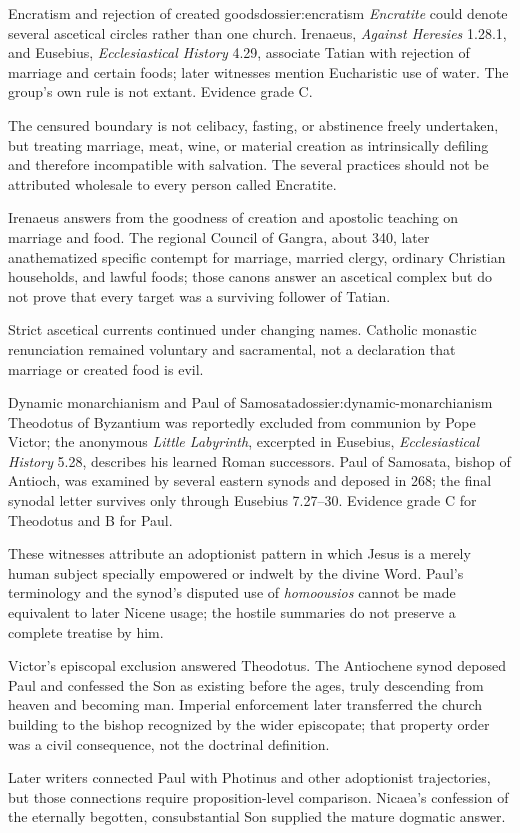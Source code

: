 \begin{heresydossier}{Encratism and rejection of created goods}{dossier:encratism}
\objectfield \emph{Encratite} could denote several ascetical circles rather than one church. Irenaeus, \emph{Against Heresies} 1.28.1, and Eusebius, \emph{Ecclesiastical History} 4.29, associate Tatian with rejection of marriage and certain foods; later witnesses mention Eucharistic use of water. The group's own rule is not extant. Evidence grade C.

\propositionfield The censured boundary is not celibacy, fasting, or abstinence freely undertaken, but treating marriage, meat, wine, or material creation as intrinsically defiling and therefore incompatible with salvation. The several practices should not be attributed wholesale to every person called Encratite.

\responsefield Irenaeus answers from the goodness of creation and apostolic teaching on marriage and food. The regional Council of Gangra, about 340, later anathematized specific contempt for marriage, married clergy, ordinary Christian households, and lawful foods; those canons answer an ascetical complex but do not prove that every target was a surviving follower of Tatian.

\aftermathfield Strict ascetical currents continued under changing names. Catholic monastic renunciation remained voluntary and sacramental, not a declaration that marriage or created food is evil.
\end{heresydossier}

\begin{heresydossier}{Dynamic monarchianism and Paul of Samosata}{dossier:dynamic-monarchianism}
\objectfield Theodotus of Byzantium was reportedly excluded from communion by Pope Victor; the anonymous \emph{Little Labyrinth}, excerpted in Eusebius, \emph{Ecclesiastical History} 5.28, describes his learned Roman successors. Paul of Samosata, bishop of Antioch, was examined by several eastern synods and deposed in 268; the final synodal letter survives only through Eusebius 7.27--30. Evidence grade C for Theodotus and B for Paul.

\propositionfield These witnesses attribute an adoptionist pattern in which Jesus is a merely human subject specially empowered or indwelt by the divine Word. Paul's terminology and the synod's disputed use of \emph{homoousios} cannot be made equivalent to later Nicene usage; the hostile summaries do not preserve a complete treatise by him.

\responsefield Victor's episcopal exclusion answered Theodotus. The Antiochene synod deposed Paul and confessed the Son as existing before the ages, truly descending from heaven and becoming man. Imperial enforcement later transferred the church building to the bishop recognized by the wider episcopate; that property order was a civil consequence, not the doctrinal definition.

\aftermathfield Later writers connected Paul with Photinus and other adoptionist trajectories, but those connections require proposition-level comparison. Nicaea's confession of the eternally begotten, consubstantial Son supplied the mature dogmatic answer.
\end{heresydossier}

